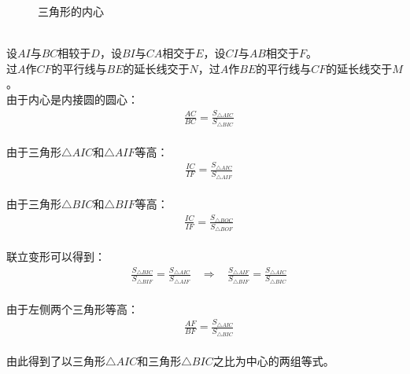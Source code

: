 \documentclass[UTF8]{ctexart}
\begin{document}
\begin{figure}[h!]
\begin{center}
            \caption{三角形的内心}
        \end{center}
    \end{figure}\\
    设$AI$与$BC$相较于$D$，设$BI$与$CA$相交于$E$，设$CI$与$AB$相交于$F$。\\[3mm]
    过$A$作$CF$的平行线与$BE$的延长线交于$N$，过$A$作$BE$的平行线与$CF$的延长线交于$M$。\\[3mm]
    由于内心是内接圆的圆心：
    \setcounter{equation}{0}
    \begin{align}
        &\frac{AC}{BC}=\frac{S_{\triangle AIC}}{S_{\triangle BIC}}
    \end{align}\\
    由于三角形$\triangle AIC$和$\triangle AIF$等高：
    \begin{align}
        &\frac{IC}{IF}=\frac{S_{\triangle AIC}}{S_{\triangle AIF}}
    \end{align}\\
    由于三角形$\triangle BIC$和$\triangle BIF$等高：
    \begin{align}
        &\frac{IC}{IF}=\frac{S_{\triangle BOC}}{S_{\triangle BOF}}
    \end{align}\\
    联立变形可以得到：
    \begin{align}
        &\frac{S_{\triangle BIC}}{S_{\triangle BIF}}=\frac{S_{\triangle AIC}}{S_{\triangle AIF}}~~~~\Longrightarrow~~~~\frac{S_{\triangle AIF}}{S_{\triangle BIF}}=\frac{S_{\triangle AIC}}{S_{\triangle BIC}}
    \end{align}\\
    由于左侧两个三角形等高：
    \begin{align}
        &\frac{AF}{BF}=\frac{S_{\triangle AIC}}{S_{\triangle BIC}}
    \end{align}\\
    由此得到了以三角形$\triangle AIC$和三角形$\triangle BIC$之比为中心的两组等式。
    
\end{document}
